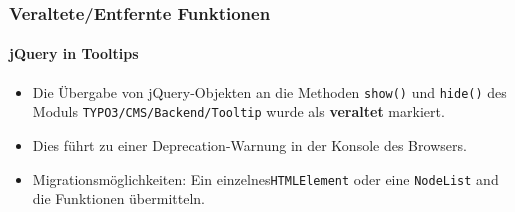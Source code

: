 %

\begin{frame}[fragile]
	\frametitle{Veraltete/Entfernte Funktionen}
	\framesubtitle{jQuery in Tooltips}


	\begin{itemize}
		\item Die Übergabe von jQuery-Objekten an die Methoden \texttt{show()} und \texttt{hide()}
			des Moduls \texttt{TYPO3/CMS/Backend/Tooltip} wurde als
			\textbf{veraltet} markiert.
		\item Dies führt zu einer Deprecation-Warnung in der Konsole des Browsers.
		\item Migrationsmöglichkeiten:
			Ein einzelnes\texttt{HTMLElement} oder eine \texttt{NodeList} and die
			Funktionen übermitteln.
	\end{itemize}

\end{frame}

